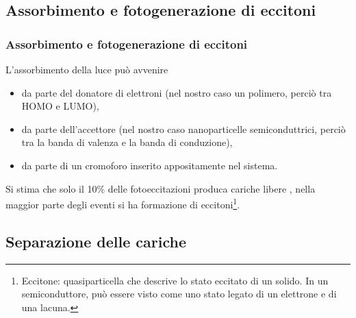 \documentclass{beamer}
\begin{document}
  \subsection{Assorbimento e fotogenerazione di eccitoni}
    \begin{frame}
      \frametitle{
      Assorbimento e fotogenerazione di eccitoni}
	L'assorbimento della luce può avvenire
	\begin{itemize}
	  \item da parte del donatore di elettroni (nel nostro caso un polimero, perciò tra HOMO e LUMO),
	  \item da parte dell'accettore (nel nostro caso nanoparticelle semiconduttrici, perciò tra la banda di valenza e la banda di conduzione),
	  \item da parte di un cromoforo inserito appositamente nel sistema.
	\end{itemize}
	Si stima che solo il 10\% delle fotoeccitazioni produca cariche libere \citep{fv-pcbm}, nella maggior parte degli eventi si ha formazione di \alert{eccitoni}\footnote{Eccitone: quasiparticella che descrive lo stato eccitato di un solido. In un semiconduttore, può essere visto come uno stato legato di un elettrone e di una lacuna.}.
    \end{frame}
  \subsection{Separazione delle cariche}
\end{document}
